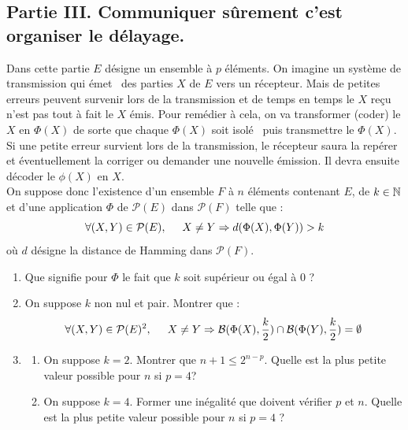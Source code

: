 \subsection*{Partie III. Communiquer sûrement c'est organiser le délayage.}
Dans cette partie $E$ désigne un ensemble à $p$ éléments. On imagine un système de transmission qui \og émet\fg~ des parties $X$ de $E$ vers un récepteur. Mais de petites erreurs peuvent survenir lors de la transmission et de temps en temps le $X$ reçu n'est pas tout à fait le $X$ émis. Pour remédier à cela, on va transformer (coder) le $X$ en $\Phi(X)$ de sorte que chaque $\Phi(X)$ soit \og isolé\fg~ puis transmettre le $\Phi(X)$. Si une petite erreur survient lors de la transmission, le récepteur saura la repérer et éventuellement la corriger ou demander une nouvelle émission. Il devra ensuite décoder le $\phi(X)$ en $X$.\\
On suppose donc l'existence d'un ensemble $F$ à $n$ éléments contenant $E$, de $k\in \mathbb{N}$ et d'une application $\Phi$ de $\mathcal P(E)$ dans $\mathcal P(F)$ telle que :
\begin{displaymath}
 \forall (X,Y)\in \mathcal P(E), \hspace{0.5cm} X \neq Y
\Rightarrow d(\Phi(X),\Phi(Y)) > k
\end{displaymath}
où $d$ désigne la distance de Hamming dans $\mathcal P(F)$.

\begin{enumerate}
 \item Que signifie pour $\Phi$ le fait que $k$ soit supérieur ou égal à $0$ ?
 
 \item On suppose $k$ non nul et pair. Montrer que :
\begin{displaymath}
\forall (X,Y) \in \mathcal{P}(E)^2, \hspace{0.5cm} X \neq Y \Rightarrow \mathcal B(\Phi(X),\frac{k}{2}) \cap \mathcal B(\Phi(Y),\frac{k}{2}) = \emptyset
\end{displaymath}

  \item \begin{enumerate}
\item On suppose $k=2$. Montrer que $n+1\leq 2^{n-p}$. Quelle est la plus petite valeur possible pour $n$ si $p=4$?
\item  On suppose $k=4$. Former une inégalité que doivent vérifier $p$ et $n$. Quelle est la plus petite valeur possible pour $n$ si $p=4$ ?
\end{enumerate}

\end{enumerate}

